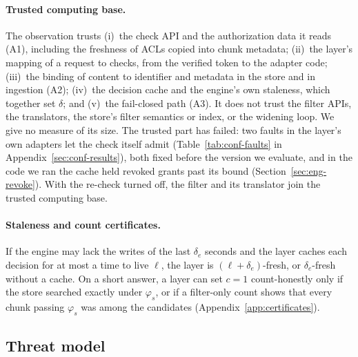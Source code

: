 \paragraph{Trusted computing base.}
The observation trusts (i)~the check API and the authorization data it reads (A1), including the freshness of ACLs
copied into chunk metadata; (ii)~the layer's mapping of a request to checks, from the verified token to the adapter
code; (iii)~the binding of content to identifier and metadata in the store and in ingestion (A2); (iv)~the decision
cache and the engine's own staleness, which together set $\delta$; and (v)~the fail-closed path (A3). It does not
trust the filter APIs, the translators, the store's filter semantics or index, or the widening loop. We give no measure
of its size. The trusted part has failed: two faults in the layer's own adapters let the check itself admit
(Table~\ref{tab:conf-faults} in Appendix~\ref{sec:conf-results}), both fixed before the version we evaluate, and in the code
we ran the cache held revoked grants past its bound (Section~\ref{sec:eng-revoke}). With the re-check turned off, the
filter and its translator join the trusted computing base.

\paragraph{Staleness and count certificates.}
If the engine may lack the writes of the last $\delta_e$ seconds and the layer caches each decision for at most a time
to live $\ell$, the layer is $(\ell + \delta_e)$-fresh, or $\delta_e$-fresh without a cache. On a short answer, a layer can set $c = 1$ count-honestly only if the store searched exactly under $\varphi_s$, or
if a filter-only count shows that every chunk passing $\varphi_s$ was among the candidates (Appendix~\ref{app:certificates}).

\subsection{Threat model}\label{sec:prob-threat}

